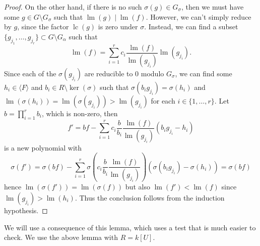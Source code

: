 \documentclass[a4paper, 12pt]{article}
\DeclareMathOperator{\LM}{lm}
\DeclareMathOperator{\LC}{lc}
\theoremstyle{changedot}
\theoremstyle{changedotbreak}
\theoremstyle{nonumberplain}
\newtheorem{proof}{Proof}
\begin{document}
\begin{proof}
  On the other hand, if there is no such $\sigma(g) \in G_{\sigma}$, then we must have some $g \in G \setminus G_{\sigma}$ such that $\LM(g) \mid \LM(f)$. However, we can't simply reduce by $g$, since the factor $\LC(g)$ is zero under $\sigma$. Instead, we can find a subset $\{g_{j_{1}}, \dots, g_{j_{r}}\} \subset G \setminus G_{\alpha}$ such that \[\LM(f) = \sum_{i = 1}^{r} c_{i} \frac{\LM(f)}{\LM(g_{j_{i}})} \LM(g_{j_{i}}).\]
  Since each of the $\sigma(g_{j_{i}})$ are reducible to 0 modulo $G_{\sigma}$, we can find some $h_{i} \in \langle F \rangle$ and $b_{i} \in R \setminus \ker(\sigma)$ such that $\sigma(b_{i} g_{j_{i}}) = \sigma(h_{i})$ and $\LM(\sigma(h_{i})) = \LM(\sigma(g_{j_{i}})) > \LM(g_{j_{i}})$ for each $i \in \{1, \dots, r\}$. Let $b = \prod_{i = 1}^{r} b_{i}$, which is non-zero, then
  \[f' = b f - \sum_{i = 1}^{r} c_{i} \frac{b}{b_{i}} \frac{\LM(f)}{\LM(g_{j_{i}})}(b_{i}g_{j_{i}} - h_{i})\]
  is a new polynomial with
  \[\sigma(f') = \sigma(b f) - \sum_{i = 1}^{r} \sigma\left(c_{i} \frac{b}{b_{i}} \frac{\LM(f)}{\LM(g_{j_{i}})}\right) (\sigma(b_{i} g_{j_{i}}) - \sigma(h_{i})) = \sigma(b f)\]
  hence $\LM(\sigma(f')) = \LM(\sigma(f))$ but also $\LM(f') < \LM(f)$ since $\LM(g_{j_{i}}) > \LM(h_{i})$. Thus the conclusion follows from the induction hypothesis.
\end{proof}

We will use a consequence of this lemma, which uses a test that is much easier to check. We use the above lemma with $R = k[U]$.
\end{document}

